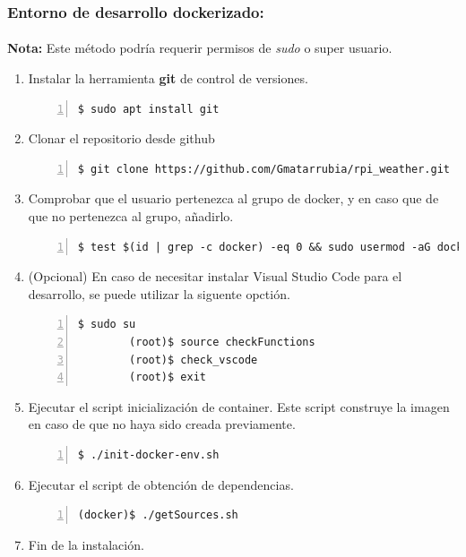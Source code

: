 \subsubsection{Entorno de desarrollo dockerizado:}

\paragraph{}\textbf{Nota:} Este método podría requerir permisos de \emph{sudo} o super
usuario.

\begin{enumerate}
    \item Instalar la herramienta \textbf{\gls{git}} de control de versiones.
    \begin{lstlisting}[style=consola, numbers=left]
        $ sudo apt install git
    \end{lstlisting}

    \item Clonar el repositorio desde github
    \begin{lstlisting}[style=consola, numbers=left]
        $ git clone https://github.com/Gmatarrubia/rpi_weather.git
    \end{lstlisting}

    \item Comprobar que el usuario pertenezca al grupo de docker, y en caso que de
    que no pertenezca al grupo, añadirlo.
    \begin{lstlisting}[style=consola, numbers=left]
        $ test $(id | grep -c docker) -eq 0 && sudo usermod -aG docker $(whoami)
    \end{lstlisting}

    \item (Opcional) En caso de necesitar instalar Visual Studio Code para el desarrollo,
    se puede utilizar la siguente opctión.
    \begin{lstlisting}[style=consola, numbers=left]
        $ sudo su
        (root)$ source checkFunctions
        (root)$ check_vscode
        (root)$ exit
    \end{lstlisting}

    \item Ejecutar el script inicialización de container. Este script construye la
    imagen en caso de que no haya sido creada previamente.
    \begin{lstlisting}[style=consola, numbers=left]
        $ ./init-docker-env.sh
    \end{lstlisting}

    \item Ejecutar el script de obtención de dependencias.
    \begin{lstlisting}[style=consola, numbers=left]
        (docker)$ ./getSources.sh
    \end{lstlisting}

    \item Fin de la instalación.
\end{enumerate}

